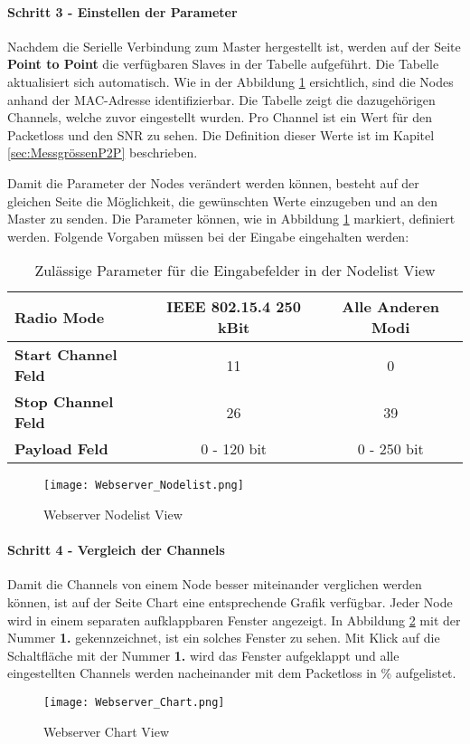 \paragraph{Schritt 3 - Einstellen der Parameter}
Nachdem die Serielle Verbindung zum Master hergestellt ist, werden auf der Seite \textbf{Point to Point} die verfügbaren Slaves in der Tabelle aufgeführt. Die Tabelle aktualisiert sich automatisch. Wie in der Abbildung \ref{fig:WebserverNodelistView} ersichtlich, sind die Nodes anhand der MAC-Adresse identifizierbar. Die Tabelle zeigt die dazugehörigen Channels, welche zuvor eingestellt wurden. Pro Channel ist ein Wert für den Packetloss und den SNR zu sehen. Die Definition dieser Werte ist im Kapitel \ref{sec:MessgrössenP2P} beschrieben. 

Damit die Parameter der Nodes verändert werden können, besteht auf der gleichen Seite die Möglichkeit, die gewünschten Werte einzugeben und an den Master zu senden. Die Parameter können, wie in Abbildung \ref{fig:WebserverNodelistView} markiert, definiert werden. Folgende Vorgaben müssen bei der Eingabe eingehalten werden:

\begin{table}[h]
\centering
\begin{tabular}{|l|c|c|} 
\hline
\textbf{Radio Mode} & \textbf{IEEE 802.15.4 250 kBit}  & \textbf{Alle Anderen Modi}  \\ 
\hline
\textbf{Start Channel Feld} & 11 & 0 \\ 
\hline
\textbf{Stop Channel Feld} & 26 & 39 \\ 
\hline
\textbf{Payload Feld} & 0 - 120 bit & 0 - 250 bit \\
\hline
\end{tabular}
\caption{Zulässige Parameter für die Eingabefelder in der Nodelist View}
\label{tab:ParameterEingabefelederNodelistView}
\end{table}


\begin{figure} [H]
	\centering
	\texttt{[image: Webserver\_Nodelist.png]}
	\caption{Webserver Nodelist View}
	\label{fig:WebserverNodelistView}
\end{figure}

\paragraph{Schritt 4 - Vergleich der Channels}
Damit die Channels von einem Node besser miteinander verglichen werden können, ist auf der Seite Chart eine entsprechende Grafik verfügbar. Jeder Node wird in einem separaten aufklappbaren Fenster angezeigt. In Abbildung \ref{fig:WebserverChartView} mit der Nummer \textbf{1.} gekennzeichnet, ist ein solches Fenster zu sehen. Mit Klick auf die Schaltfläche mit der Nummer \textbf{1.} wird das Fenster aufgeklappt und alle eingestellten Channels werden nacheinander mit dem Packetloss in \% aufgelistet.
\begin{figure} [H]
	\centering
	\texttt{[image: Webserver\_Chart.png]}
	\caption{Webserver Chart View}
	\label{fig:WebserverChartView}
\end{figure}

